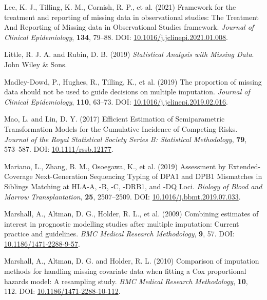\documentclass[
  letterpaper,
  DIV=11,
  numbers=noendperiod]{scrreprt}
\newlength{\cslhangindent}
\newlength{\cslentryspacingunit} %
\newenvironment{CSLReferences}[2] %
 {%
  \setlength{\parindent}{0pt}
  \ifodd #1
  \let\oldpar\par
  \def\par{\hangindent=\cslhangindent\oldpar}
  \fi
  \setlength{\parskip}{#2\cslentryspacingunit}
 }%
 {}
\begin{document}
\begin{CSLReferences}{1}{0}
\leavevmode{}%
Lee, K. J., Tilling, K. M., Cornish, R. P., et al. (2021) Framework for
the treatment and reporting of missing data in observational studies:
{The Treatment And Reporting} of {Missing} data in {Observational
Studies} framework. \emph{Journal of Clinical Epidemiology},
\textbf{134}, 79--88. DOI:
\href{https://doi.org/10.1016/j.jclinepi.2021.01.008}{10.1016/j.jclinepi.2021.01.008}.

\leavevmode{}%
Little, R. J. A. and Rubin, D. B. (2019) \emph{Statistical {Analysis}
with {Missing Data}}. John Wiley \& Sons.

\leavevmode{}%
Madley-Dowd, P., Hughes, R., Tilling, K., et al. (2019) The proportion
of missing data should not be used to guide decisions on multiple
imputation. \emph{Journal of Clinical Epidemiology}, \textbf{110},
63--73. DOI:
\href{https://doi.org/10.1016/j.jclinepi.2019.02.016}{10.1016/j.jclinepi.2019.02.016}.

\leavevmode{}%
Mao, L. and Lin, D. Y. (2017) Efficient {Estimation} of {Semiparametric
Transformation Models} for the {Cumulative Incidence} of {Competing
Risks}. \emph{Journal of the Royal Statistical Society Series B:
Statistical Methodology}, \textbf{79}, 573--587. DOI:
\href{https://doi.org/10.1111/rssb.12177}{10.1111/rssb.12177}.

\leavevmode{}%
Mariano, L., Zhang, B. M., Osoegawa, K., et al. (2019) Assessment by
{Extended-Coverage Next-Generation Sequencing Typing} of {DPA1} and
{DPB1 Mismatches} in {Siblings Matching} at {HLA-A}, -{B}, -{C},
-{DRB1}, and -{DQ Loci}. \emph{Biology of Blood and Marrow
Transplantation}, \textbf{25}, 2507--2509. DOI:
\href{https://doi.org/10.1016/j.bbmt.2019.07.033}{10.1016/j.bbmt.2019.07.033}.

\leavevmode{}%
Marshall, A., Altman, D. G., Holder, R. L., et al. (2009) Combining
estimates of interest in prognostic modelling studies after multiple
imputation: Current practice and guidelines. \emph{BMC Medical Research
Methodology}, \textbf{9}, 57. DOI:
\href{https://doi.org/10.1186/1471-2288-9-57}{10.1186/1471-2288-9-57}.

\leavevmode{}%
Marshall, A., Altman, D. G. and Holder, R. L. (2010) Comparison of
imputation methods for handling missing covariate data when fitting a
{Cox} proportional hazards model: A resampling study. \emph{BMC Medical
Research Methodology}, \textbf{10}, 112. DOI:
\href{https://doi.org/10.1186/1471-2288-10-112}{10.1186/1471-2288-10-112}.


\end{CSLReferences}
\end{document}

